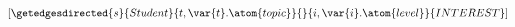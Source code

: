 $\left[\getedgesdirected{s}{Student}{t, \var{t}.\atom{topic}}{}{i, \var{i}.\atom{level}}{INTEREST}\right]$